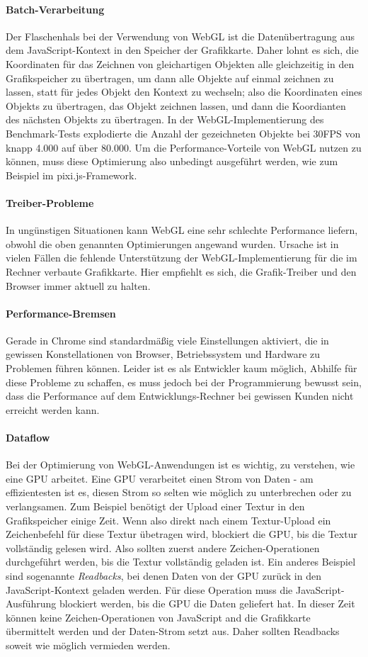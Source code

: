 \documentclass[a4paper, 12pt]{article}
\begin{document}
\paragraph{Batch-Verarbeitung} Der Flaschenhals bei der Verwendung von WebGL ist die Datenübertragung aus dem JavaScript-Kontext in den Speicher der Grafikkarte. Daher lohnt es sich, die Koordinaten für das Zeichnen von gleichartigen Objekten alle gleichzeitig in den Grafikspeicher zu übertragen, um dann alle Objekte auf einmal zeichnen zu lassen, statt für jedes Objekt den Kontext zu wechseln; also die Koordinaten eines Objekts zu übertragen, das Objekt zeichnen lassen, und dann die Koordianten des nächsten Objekts zu übertragen. In der WebGL-Implementierung des Benchmark-Tests explodierte die Anzahl der gezeichneten Objekte bei 30FPS von knapp 4.000 auf über 80.000. Um die Performance-Vorteile von WebGL nutzen zu können, muss diese Optimierung also unbedingt ausgeführt werden, wie zum Beispiel im pixi.js-Framework.
\paragraph{Treiber-Probleme} In ungünstigen Situationen kann WebGL eine sehr schlechte Performance liefern, obwohl die oben genannten Optimierungen angewand wurden. Ursache ist in vielen Fällen die fehlende Unterstützung der WebGL-Implementierung für die im Rechner verbaute Grafikkarte. Hier empfiehlt es sich, die Grafik-Treiber und den Browser immer aktuell zu halten.
\paragraph{Performance-Bremsen} Gerade in Chrome sind standardmäßig viele Einstellungen aktiviert, die in gewissen Konstellationen von Browser, Betriebssystem und Hardware zu Problemen führen können. Leider ist es als Entwickler kaum möglich, Abhilfe für diese Probleme zu schaffen, es muss jedoch bei der Programmierung bewusst sein, dass die Performance auf dem Entwicklungs-Rechner bei gewissen Kunden nicht erreicht werden kann.
\paragraph{Dataflow} Bei der Optimierung von WebGL-Anwendungen ist es wichtig, zu verstehen, wie eine GPU arbeitet. Eine GPU verarbeitet einen Strom von Daten - am effizientesten ist es, diesen Strom so selten wie möglich zu unterbrechen oder zu verlangsamen. Zum Beispiel benötigt der Upload einer Textur in den Grafikspeicher einige Zeit. Wenn also direkt nach einem Textur-Upload ein Zeichenbefehl für diese Textur übetragen wird, blockiert die GPU, bis die Textur vollständig gelesen wird. Also sollten zuerst andere Zeichen-Operationen durchgeführt werden, bis die Textur vollständig geladen ist. Ein anderes Beispiel sind sogenannte \emph{Readbacks}, bei denen Daten von der GPU zurück in den JavaScript-Kontext geladen werden. Für diese Operation muss die JavaScript-Ausführung blockiert werden, bis die GPU die Daten geliefert hat. In dieser Zeit können keine Zeichen-Operationen von JavaScript and die Grafikkarte übermittelt werden und der Daten-Strom setzt aus. Daher sollten Readbacks soweit wie möglich vermieden werden.
\end{document}
